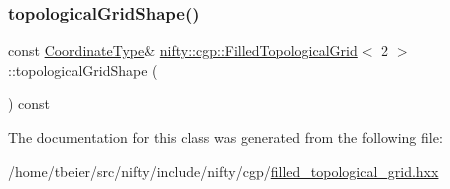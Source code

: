 \subsubsection{\texorpdfstring{topological\+Grid\+Shape()}{topologicalGridShape()}}
{\footnotesize\ttfamily const \hyperlink{classnifty_1_1cgp_1_1FilledTopologicalGrid_3_012_01_4_a744d1529d7bb50ca95236a5abaded0ad}{Coordinate\+Type}\& \hyperlink{classnifty_1_1cgp_1_1FilledTopologicalGrid}{nifty\+::cgp\+::\+Filled\+Topological\+Grid}$<$ 2 $>$\+::topological\+Grid\+Shape (\begin{DoxyParamCaption}{ }\end{DoxyParamCaption}) const\hspace{0.3cm}{\ttfamily [inline]}}



The documentation for this class was generated from the following file\+:\begin{DoxyCompactItemize}
\item 
/home/tbeier/src/nifty/include/nifty/cgp/\hyperlink{filled__topological__grid_8hxx}{filled\+\_\+topological\+\_\+grid.\+hxx}\end{DoxyCompactItemize}
